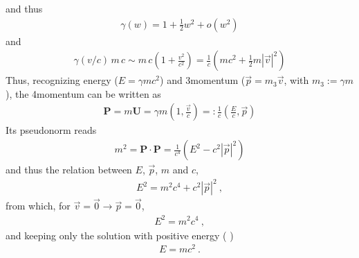 \documentclass[letterpaper,10pt,english]{jupyterBook}
\begin{document}
\sphinxAtStartPar
and thus
\begin{equation*}
\begin{split}\gamma(w) = 1 + \frac{1}{2} w^2 + o(w^2)\end{split}
\end{equation*}
\sphinxAtStartPar
and
\begin{equation*}
\begin{split}\gamma(v/c) \, m \, c \sim m \, c \left( 1 + \frac{v^2}{c^2} \right) = \frac{1}{c} \left( mc^2 + \frac{1}{2} m |\vec{v}|^2 \right) \end{split}
\end{equation*}
\sphinxAtStartPar
Thus, recognizing energy (\(E = \gamma m c^2\)) and 3\sphinxhyphen{}momentum (\(\vec{p} = m_3 \vec{v}\), with \(m_3 := \gamma m\)), the 4\sphinxhyphen{}momentum can be written as
\begin{equation*}
\begin{split}\mathbf{P} = m \mathbf{U} = \gamma m \left( 1, \frac{\vec{v}}{c} \right) =: \frac{1}{c} \left( \frac{E}{c}, \vec{p} \right)\end{split}
\end{equation*}
\sphinxAtStartPar
Its pseudo\sphinxhyphen{}norm reads
\begin{equation*}
\begin{split}m^2 = \mathbf{P} \cdot \mathbf{P} = \frac{1}{c^4} \left( E^2 - c^2 |\vec{p}|^2 \right) \end{split}
\end{equation*}
\sphinxAtStartPar
and thus the relation between \(E\), \(\vec{p}\), \(m\) and \(c\),
\begin{equation*}
\begin{split}E^2 = m^2 c^4 + c^2 |\vec{p}|^2 \ ,\end{split}
\end{equation*}
\sphinxAtStartPar
from which, for \(\vec{v} = \vec{0} \rightarrow \vec{p} = \vec{0}\),
\begin{equation*}
\begin{split}E^2 = m^2 c^4 \ ,\end{split}
\end{equation*}
\sphinxAtStartPar
and keeping only the solution with positive energy ( )
\begin{equation*}
\begin{split}E = m c^2 \ .\end{split}
\end{equation*}
\end{document}
